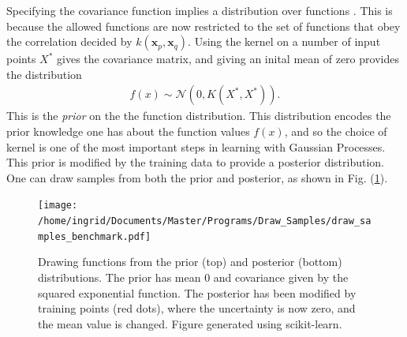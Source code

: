 \documentclass[twoside,english]{uiofysmaster}
\begin{document}
Specifying the covariance function implies a distribution over functions \cite{rasmussen2006gaussian}. This is because the allowed functions are now restricted to the set of functions that obey the correlation decided by $k(\textbf{x}_p, \textbf{x}_q)$. Using the kernel on a number of input points $X^*$ gives the covariance matrix, and giving an inital mean of zero provides the distribution
\begin{align}
f(x) \sim \mathcal{N} (0, K(X^*, X^*)).
\end{align} 
This is the \textit{prior} on the the function distribution. This distribution encodes the prior knowledge one has about the function values $f(x)$, and so the choice of kernel is one of the most important steps in learning with Gaussian Processes. This prior is modified by the training data to provide a posterior distribution. One can draw samples from both the prior and posterior, as shown in Fig. (\ref{Fig:: gaussian process : prior posterior drawn samples}).

\begin{figure}
\centering
\texttt{[image: /home/ingrid/Documents/Master/Programs/Draw\_Samples/draw\_samples\_benchmark.pdf]}
\caption{Drawing functions from the prior (top) and posterior (bottom) distributions. The prior has mean 0 and covariance given by the squared exponential function. The posterior has been modified by training points (red dots), where the uncertainty is now zero, and the mean value is changed. Figure generated using scikit-learn.}
\label{Fig:: gaussian process : prior posterior drawn samples}
\end{figure}
\end{document}
